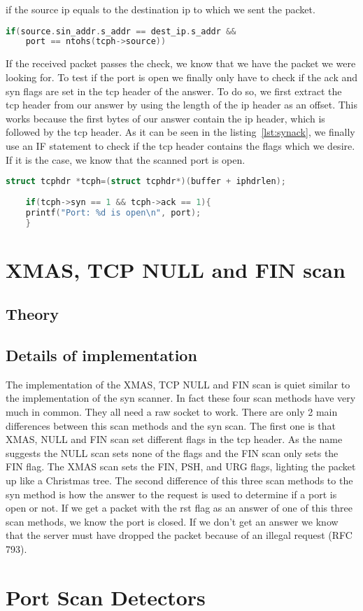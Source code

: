 \documentclass[a4paper]{scrartcl}
\begin{document}
	if the source ip equals to the destination ip to which we sent the packet.
	\begin{lstlisting}[frame= single, language=C, caption= IF statement to check origin of packet, label=lst:checkorigin]
	if(source.sin_addr.s_addr == dest_ip.s_addr &&
	port == ntohs(tcph->source))
	\end{lstlisting}
	If the received packet passes the check, we know that we have the packet we were looking for. To test if the port is open we finally only have to check if the ack and syn flags are set in the tcp header
	of the answer. To do so, we first extract the tcp header from our answer by using the length of the ip header as an offset. This works because the first bytes of our answer contain the ip header, which
	is followed by the tcp header. As it can be seen in the listing~\ref{lst:synack}, we finally use an IF statement to check if the tcp header contains the flags which we desire. If it is the case, we know that the scanned
	port is open.
	\begin{lstlisting}[frame= single, language=C, caption=C code to check if answer contains syn and ack flag, label=lst:synack]
	struct tcphdr *tcph=(struct tcphdr*)(buffer + iphdrlen);
	
	if(tcph->syn == 1 && tcph->ack == 1){
	printf("Port: %d is open\n", port);
	} 
	\end{lstlisting}
	\section{XMAS, TCP NULL and FIN scan}
		\subsection{Theory}
		
		\subsection{Details of implementation}
		The implementation of the XMAS, TCP NULL and FIN scan is quiet similar to the implementation of the syn scanner. In fact these four scan methods have very much in common.
		They all need a raw socket to work. There are only 2 main differences between this scan methods and the syn scan. The first one is that XMAS, NULL and FIN scan set different flags
		in the tcp header. As the name suggests the NULL scan sets none of the flags and the FIN scan only sets the FIN flag. The XMAS scan sets the FIN, PSH, and URG flags, lighting the packet up like a Christmas tree.
		The second difference of this three scan methods to the syn method is how the answer to the request is used to determine if a port is open or not. If we get a packet with the rst flag as an answer of one
		of this three scan methods, we know the port is closed. If we don't get an answer we know that the server must have dropped the packet because of an illegal request (RFC 793).
		
		
		
		 
	\section{Port Scan Detectors}
	
	
	
	
	\newpage
	\printbibliography
\end{document}
